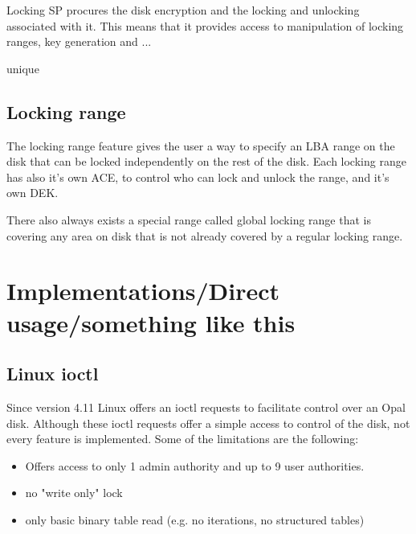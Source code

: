 Locking SP procures the disk encryption and the locking and unlocking associated with it. This means that it provides access to manipulation of locking ranges, key generation and ...

unique

\subsection{Locking range}

The locking range feature gives the user a way to specify an LBA range on the disk that can be locked independently on the rest of the disk. Each locking range has also it's own ACE, to control who can lock and unlock the range, and it's own DEK.

There also always exists a special range called global locking range that is covering any area on disk that is not already covered by a regular locking range.

\section{Implementations/Direct usage/something like this}


\subsection{Linux ioctl}

Since version 4.11 Linux offers an ioctl requests to facilitate control over an Opal disk. Although these ioctl requests offer a simple access to control of the disk, not every feature is implemented. Some of the limitations are the following: 
\begin{itemize}
\item Offers access to only 1 admin authority and up to 9 user authorities.
\item no "write only" lock
\item only basic binary table read (e.g. no iterations, no structured tables)
\end{itemize}

